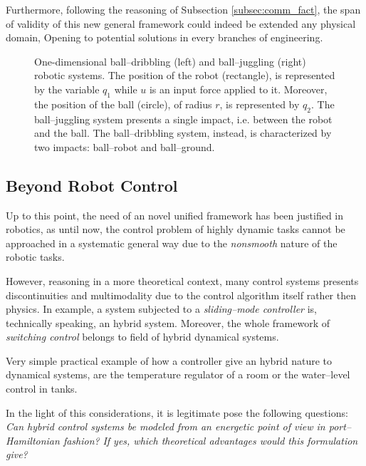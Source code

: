 Furthermore, following the reasoning of Subsection \ref{subsec:comm_fact}, the span of validity of this new general framework could indeed be extended any physical domain, Opening to potential solutions in every branches of engineering.
%
\begin{figure}[!t]
	\centering
	
	
	\caption{One-dimensional ball--dribbling (left) and ball--juggling (right) robotic systems. The position of the robot (rectangle), is represented by the variable $q_1$ while $u$ is an input force applied to it. Moreover, the position of the ball (circle), of radius $r$, is represented by $q_2$. The ball--juggling system presents a single impact, i.e. between the robot and the ball. The ball--dribbling system, instead, is characterized by two impacts: ball--robot and ball--ground.}
	\label{fig:1D}
\end{figure}
%
\subsection{Beyond Robot Control}
Up to this point, the need of an novel unified framework has been justified in robotics, as until now, the control problem of highly dynamic tasks cannot be approached in a systematic general way due to the \textit{nonsmooth} nature of the robotic tasks.
%
\newline

%
However, reasoning in a more theoretical context, many control systems presents discontinuities and multimodality due to the control algorithm itself rather then physics. 
In example, a system subjected to a \textit{sliding--mode controller} \cite{pisano2011sliding} is, technically speaking, an hybrid system. Moreover, the whole framework of \textit{switching control} belongs to field of hybrid dynamical systems.
%
\newline

%
Very simple practical example of how a controller give an hybrid nature to dynamical systems, are the temperature regulator of a room or the water--level control in tanks.
%
\newline

%
In the light of this considerations, it is legitimate pose the following questions: \newline
\textit{Can hybrid control systems be modeled from an energetic point of view in port--Hamiltonian fashion?}\newline
\textit{If yes, which theoretical advantages would this formulation give?}

